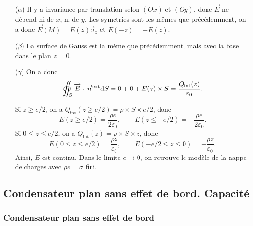                 \begin{enumerate}
                    \item [($\alpha$)] Il y a invariance par translation selon $(Ox)$ et $(Oy)$, donc $\vec{E}$ ne dépend ni de $x$, ni de $y$. Les symétries sont les mêmes que précédemment, on a donc $\vec{E}(M)=E(z)\vec{u}_z$ et $E(-z)=-E(z)$.
                    \item [($\beta$)] La surface de Gauss est la même que précédemment, mais avec la base dans le plan $z=0$.
                    \item [($\gamma$)] On a donc 
                    \begin{equation*}
                        \oiint_{S}\protect\overrightarrow{{E}}\cdot\protect\overrightarrow{{n}}^{\text{ext}}\mathrm{d} S=0+0+E(z)\times S=\frac{Q_{\text{int}}(z)}{\varepsilon_0}.
                    \end{equation*}

                    Si $z\geqslant e/2$, on a $Q_{\text{int}}(z\geqslant e/2)=\rho\times S\times e/2$, donc 
                    \begin{equation*}
                        \boxed{
                        E(z\geqslant e/2)=\frac{\rho e}{2\varepsilon_0},\qquad E(z\leqslant -e/2)=-\frac{\rho e}{2\varepsilon_0}.}
                    \end{equation*}
                    Si $0\leqslant z\leqslant e/2$, on a $Q_{\text{int}}(z)=\rho\times S\times z$, donc 
                    \begin{equation*}
                        \boxed{
                        E(0\leqslant z\leqslant e/2)=\frac{\rho z}{\varepsilon_0},\qquad E(-e/2\leqslant z\leqslant 0)=-\frac{\rho z}{\varepsilon_0}.}
                    \end{equation*}
                    Ainsi, $E$ est continu. Dans le limite $e\to0$, on retrouve le modèle de la nappe de charges avec $\rho e=\sigma$ fini.
                \end{enumerate}

    \subsection{Condensateur plan sans effet de bord. Capacité}
        \subsubsection{Condensateur plan sans effet de bord}

